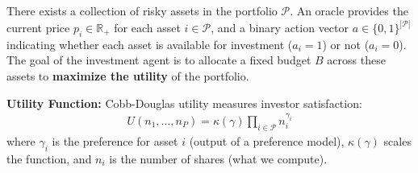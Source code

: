 \documentclass[aspectratio=169]{beamer}
\begin{document}
\begin{frame}
There exists a collection of risky assets in the portfolio $\mathcal{P}$.
An oracle provides the current price $p_{i}\in\mathbb{R}_{+}$ for each asset $i\in\mathcal{P}$, and 
a binary action vector $a\in\{0,1\}^{|\mathcal{P}|}$ indicating whether each asset is available for investment ($a_{i}=1$) or not ($a_{i}=0$).
The goal of the investment agent is to allocate a fixed budget $B$ across these assets to \textbf{maximize the utility} of the portfolio. 
\end{frame}

\begin{frame}
\textbf{Utility Function:} Cobb-Douglas utility measures investor satisfaction:
\begin{align*}
U(n_1, \dots, n_P) = \kappa(\gamma) \prod_{i \in \mathcal{P}} n_i^{\gamma_i}
\end{align*}
where $\gamma_i$ is the preference for asset $i$ (output of a preference model), $\kappa(\gamma)$ scales the function, and $n_i$ is the number of shares (what we compute).
\end{frame}
\end{document}
